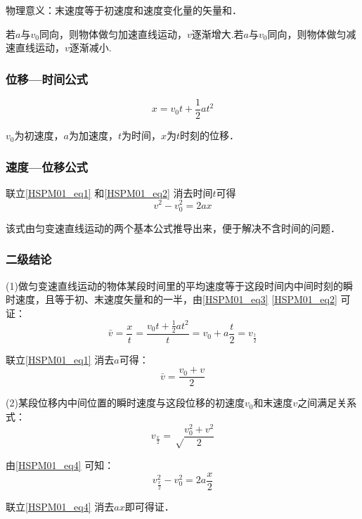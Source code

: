 物理意义：末速度等于初速度和速度变化量的矢量和．

若$a$与$v_0$同向，则物体做匀加速直线运动，$v$逐渐增大.若$a$与$v_0$同向，则物体做匀减速直线运动，$v$逐渐减小.

\subsubsection{位移—时间公式}
\begin{equation}\label{HSPM01_eq2}
x=v_0 t+\frac12at^2
\end{equation}

$v_0$为初速度，$a$为加速度，$t$为时间，$x$为$t$时刻的位移．

\subsubsection{速度—位移公式}
联立\autoref{HSPM01_eq1} 和\autoref{HSPM01_eq2} 消去时间$t$可得
\begin{equation}\label{HSPM01_eq4}
v^2-v_0^2=2ax
\end{equation}

该式由匀变速直线运动的两个基本公式推导出来，便于解决不含时间的问题．

\subsubsection{二级结论}
(1)做匀变速直线运动的物体某段时间里的平均速度等于这段时间内中间时刻的瞬时速度，且等于初、末速度矢量和的一半，由\autoref{HSPM01_eq3} \autoref{HSPM01_eq2} 可证：
\begin{equation}
\bar v=\frac xt=\frac{v_0t+\frac 12at^2}{t}=v_0+a\frac t2=v_{\frac t2}
\end{equation}

联立\autoref{HSPM01_eq1} 消去$a$可得：
\begin{equation}
\bar v=\frac{v_0+v}{2}
\end{equation}

(2)某段位移内中间位置的瞬时速度与这段位移的初速度$v_0$和末速度$v$之间满足关系式：
\begin{equation}
v_\frac x2=\sqrt \frac{v_0^2+v^2}2
\end{equation}

由\autoref{HSPM01_eq4} 可知：
\begin{equation}
v_{\frac x2}^2-v_0^2=2a\frac x2
\end{equation}

联立\autoref{HSPM01_eq4} 消去$ax$即可得证．

